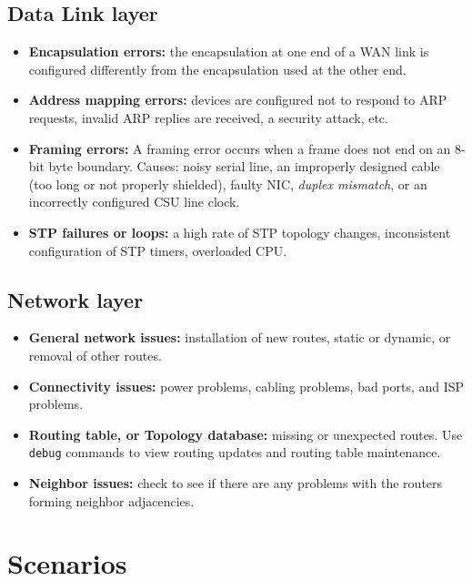 \subsection{Data Link layer}

\begin{itemize}
\item \textbf{Encapsulation errors:} the encapsulation at one end of a WAN link is configured differently from the encapsulation used at the other end.

\item \textbf{Address mapping errors:} devices are configured not to respond to ARP requests, invalid ARP replies are received, a security attack, etc.

\item \textbf{Framing errors:} A framing error occurs when a frame does not end on an 8-bit byte boundary. Causes: noisy serial line, an improperly designed cable (too long or not properly shielded), faulty NIC, \emph{duplex mismatch}, or an incorrectly configured CSU line clock.

\item \textbf{STP failures or loops:} a high rate of STP topology changes, inconsistent configuration of STP timers, overloaded CPU. 
\end{itemize}

\subsection{Network layer}

\begin{itemize}
\item \textbf{General network issues:} installation of new routes, static or dynamic, or removal of other routes. 

\item \textbf{Connectivity issues:} power problems, cabling problems, bad ports, and ISP problems. 

\item \textbf{Routing table, or Topology database:} missing or unexpected routes. Use \verb|debug| commands to view routing updates and routing table maintenance.

\item \textbf{Neighbor issues:} check to see if there are any problems with the routers forming neighbor adjacencies.
\end{itemize}
\section{Scenarios}

